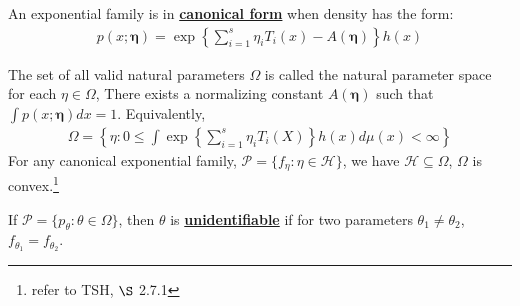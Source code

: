 \begin{definition}
    An exponential family is in \textbf{\underline{canonical form}} when density has the form:
    \begin{gather}
        p(x;\boldsymbol{\eta})=\exp\left\{ \sum_{i=1}^s\eta_iT_i(x)-A(\boldsymbol{\eta}) \right\}h(x)
    \end{gather}
\end{definition}

\begin{definition}
    The set of all valid natural parameters $\Omega$ is called the natural parameter space for each $\eta\in\Omega$,
    There exists a normalizing constant $A(\boldsymbol{\eta})$ such that $\int{p(x;\boldsymbol{\eta})}dx=1$.
    Equivalently,
    \begin{gather}
        \Omega=\left\{ \eta:0\leq\int\exp\left\{\sum_{i=1}^s\eta_iT_i(X)\right\}h(x)d\mu(x) < \infty \right\}
    \end{gather}
    For any canonical exponential family, $\mathcal{P}=\{f_\eta:\eta\in\mathcal{H}\}$,
    we have $\mathcal{H}\subseteq\Omega$, $\Omega$ is convex.\footnote{refer to TSH, $\S$ 2.7.1}
\end{definition}

\begin{definition}[Unidentifiable]
    If $\mathcal{P}=\{p_\theta:\theta\in\Omega\}$, then $\theta$ is \textbf{\underline{unidentifiable}}
    if for two parameters $\theta_1\neq\theta_2$, $f_{\theta_1}=f_{\theta_2}$.
\end{definition}

